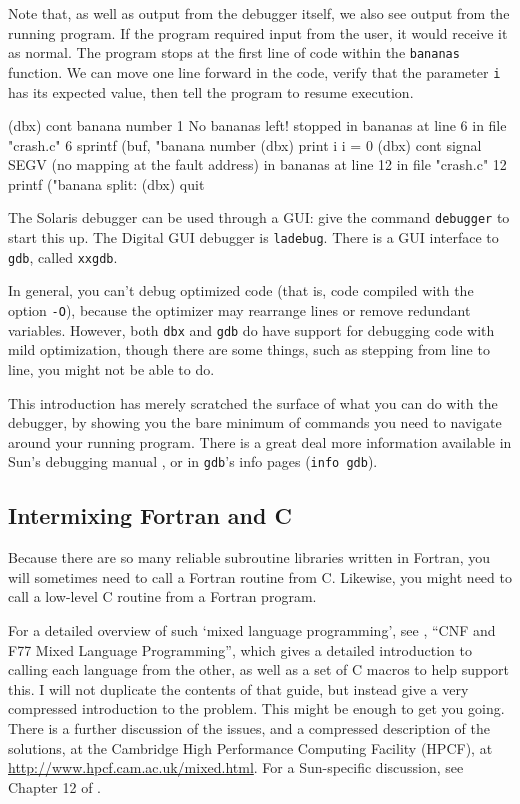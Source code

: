 \documentclass[11pt,oneside,chapters]{starlink}
\begin{document}
Note that, as well as output from the debugger itself, we
also see output from the running program.  If the program
required input from the user, it would receive it as
normal.  The program stops at the first line of code
within the \texttt{bananas} function.  We can move one
line forward in the code, verify that the parameter
\texttt{i} has its expected value, then tell the
program to resume execution.

\begin{terminalv}
(dbx) cont
banana number 1
No bananas left!
stopped in bananas at line 6 in file "crash.c"
6       sprintf (buf, "banana number %
(dbx) print i
i = 0
(dbx) cont
signal SEGV (no mapping at the fault address) in bananas
at line 12 in file "crash.c"
12           printf ("banana split: %
(dbx) quit
\end{terminalv}

The Solaris debugger can be used through a GUI: give the
command \texttt{debugger} to start this up.  The Digital
GUI debugger is \texttt{ladebug}.  There is a GUI
interface to \texttt{gdb}, called \texttt{xxgdb}.

In general, you can't debug optimized code (that is, code
compiled with the option \texttt{-O}), because the
optimizer may rearrange lines or remove redundant
variables.  However, both \texttt{dbx} and
\texttt{gdb} do have support for debugging code with
mild optimization, though there are some things, such as
stepping from line to line, you might not be able to do.

This introduction has merely scratched the surface of
what you can do with the debugger, by showing you the bare
minimum of commands you need to navigate around your
running program.  There is a great deal more information
available in Sun's debugging manual
\citep{sundebug}, or in \texttt{gdb}'s
info pages (\texttt{info gdb}).

\subsection{Intermixing Fortran and C}
\label{s:candf}

Because there are so many reliable subroutine libraries
written in Fortran, you will sometimes need to call a
Fortran routine from C.  Likewise, you might need to call
a low-level C routine from a Fortran program.

For a detailed overview of such `mixed language
programming', see ,
``CNF and F77 Mixed Language Programming'', which
gives a detailed introduction to calling each language
from the other, as well as a set of C macros to help
support this.  I will not duplicate the contents of that
guide, but instead give a very compressed introduction to
the problem.  This might be enough to get you going.
There is a further discussion of the issues, and a
compressed description of the solutions, at the Cambridge
High Performance Computing Facility (HPCF), at
\url{http://www.hpcf.cam.ac.uk/mixed.html}.  For a
Sun-specific discussion, see Chapter 12 of
\citet{sunf77}.
\end{document}
